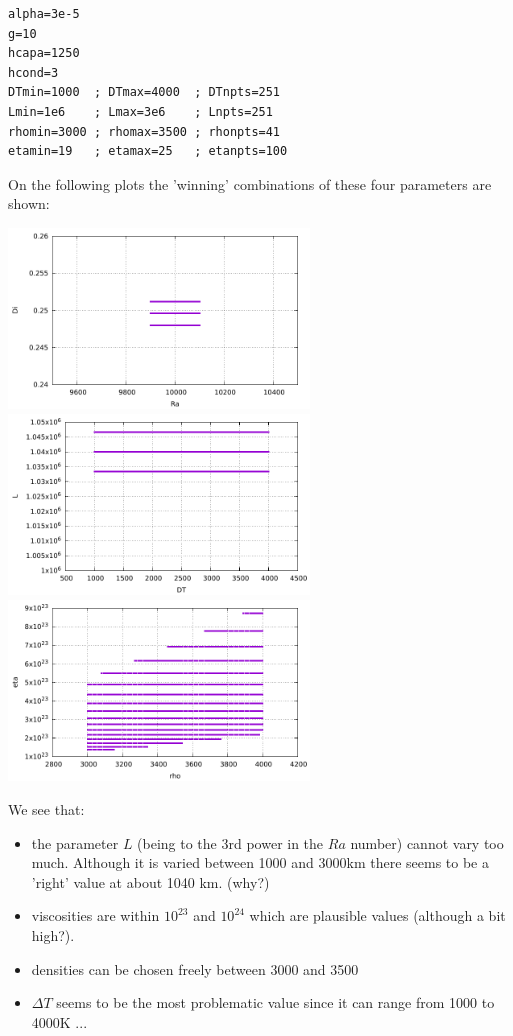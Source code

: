 \begin{lstlisting}
alpha=3e-5
g=10
hcapa=1250
hcond=3
DTmin=1000  ; DTmax=4000  ; DTnpts=251
Lmin=1e6    ; Lmax=3e6    ; Lnpts=251
rhomin=3000 ; rhomax=3500 ; rhonpts=41
etamin=19   ; etamax=25   ; etanpts=100
\end{lstlisting}


On the following plots the 'winning' combinations of these four parameters are shown:
\begin{center}
\includegraphics[width=8cm]{python_codes/fieldstone_24/looking_for_Ra_Di/RaDi.pdf}
\includegraphics[width=8cm]{python_codes/fieldstone_24/looking_for_Ra_Di/DTL.pdf}
\includegraphics[width=8cm]{python_codes/fieldstone_24/looking_for_Ra_Di/rhoeta.pdf}
\end{center}

We see that:
\begin{itemize}
\item the parameter $L$ (being to the 3rd power in the $Ra$ number) cannot vary too much. Although it is 
varied between 1000 and 3000km there seems to be a 'right' value at about 1040 km. (why?)
\item viscosities are within $10^{23}$ and $10^{24}$ which are plausible values (although a bit high?).
\item densities can be chosen freely between 3000 and 3500
\item $\Delta T$ seems to be the most problematic value since it can range from 1000 to 4000K ...  
\end{itemize}


